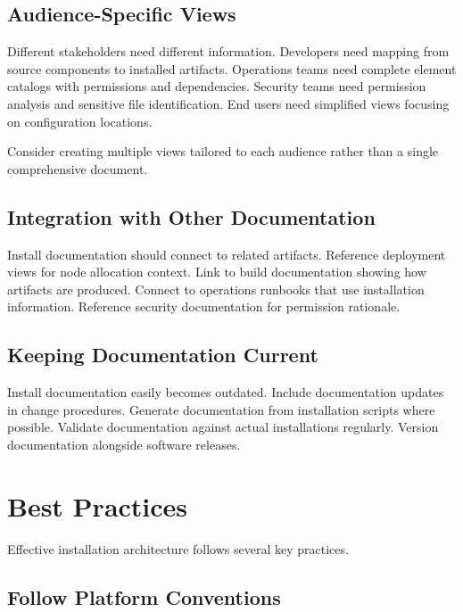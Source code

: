 \documentclass[11pt]{article}
\begin{document}
\subsection{Audience-Specific Views}

Different stakeholders need different information. Developers need mapping from source components to installed artifacts. Operations teams need complete element catalogs with permissions and dependencies. Security teams need permission analysis and sensitive file identification. End users need simplified views focusing on configuration locations.

Consider creating multiple views tailored to each audience rather than a single comprehensive document.

\subsection{Integration with Other Documentation}

Install documentation should connect to related artifacts. Reference deployment views for node allocation context. Link to build documentation showing how artifacts are produced. Connect to operations runbooks that use installation information. Reference security documentation for permission rationale.

\subsection{Keeping Documentation Current}

Install documentation easily becomes outdated. Include documentation updates in change procedures. Generate documentation from installation scripts where possible. Validate documentation against actual installations regularly. Version documentation alongside software releases.

\section{Best Practices}

Effective installation architecture follows several key practices.

\subsection{Follow Platform Conventions}
\end{document}
